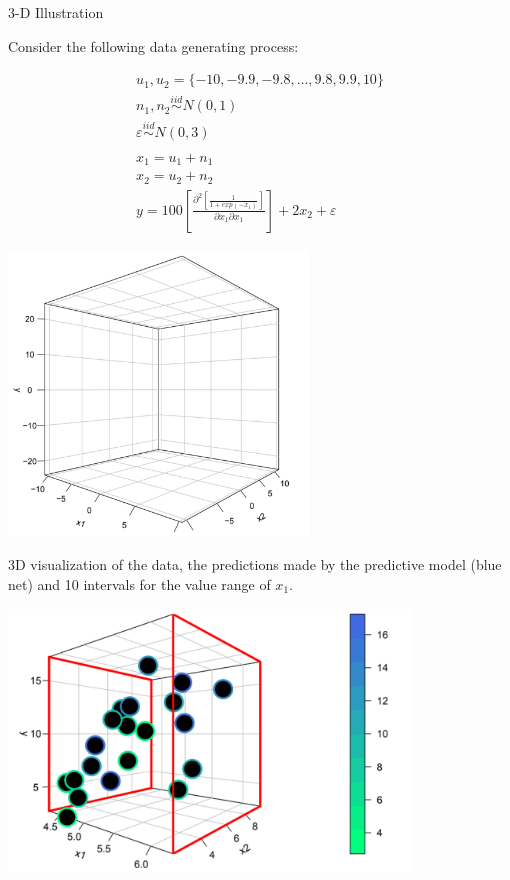 \begin{vbframe}{3-D Illustration}

Consider the following data generating process:

$$
\begin{gathered}
u_1, u_2 =  \{-10, -9.9, -9.8, \dots, 9.8, 9.9, 10\} \\
n_1, n_2 \stackrel{iid}{\sim}  N(0, 1) \\
\varepsilon \stackrel{iid}{\sim} N(0, 3) \\
\\
x_1 = u_1 + n_1 \\
x_2 = u_2 + n_2 \\
y = 100  \left[ \frac{\partial^2 \left[ \frac{1}{1 + exp(-x_1)} \right] }{\partial x_1 \partial x_1} \right] + 2 x_2 + \varepsilon
\end{gathered}
$$

\framebreak


\begin{center}
\includegraphics[width=0.6\textwidth]{figure_man/3D01.png}
\end{center}

3D visualization of the data, the predictions made by the predictive model (blue net) and 10 intervals for the value range of $x_1$.

\framebreak


\begin{center}
\includegraphics[width=0.8\textwidth]{figure_man/3D02.png}
\end{center}


\end{vbframe}
